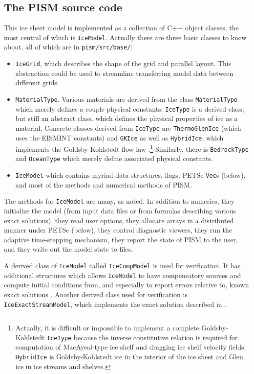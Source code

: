 \documentclass[11pt,final]{amsart}
\renewcommand{\t}[1]{\texttt{#1}}
\begin{document}
\subsection{The PISM source code} This ice sheet model is implemented as a collection of C++ object classes, the most central of which is \t{IceModel}.  Actually there are three basic classes to know about, all of which are in \verb|pism/src/base/|:
\begin{itemize}
\item \t{IceGrid}, which describes the shape of the grid and parallel
layout. This abstraction could be used to streamline transferring model data between
different grids.
\item \t{MaterialType}.  Various materials are derived from the class \t{MaterialType} which merely defines a couple physical constants. \t{IceType} is a derived class, but still an abstract class. which defines the physical properties of ice as a material.  Concrete classes derived from \t{IceType} are \t{ThermoGlenIce} (which uses the
EISMINT constants) and \t{GKIce} as well as \t{HybridIce}, which implements the Goldsby-Kohlstedt flow law \cite{GoldsbyKohlstedt}.\footnote{Actually, it is difficult or impossible to implement a complete Goldsby-Kohlstedt \t{IceType} because the inverse constitutive relation is required for computation of MacAyeal-type ice shelf and dragging ice shelf \cite{MacAyeal} velocity fields. \t{HybridIce} is Goldsby-Kohlstedt ice in the interior of the ice sheet and Glen ice in ice streams and
shelves.}  Similarly, there is \t{BedrockType} and \t{OceanType} which merely define
associated physical constants.
\item \t{IceModel} which contains myriad data structures, flags, PETSc \verb|Vec|s (below), and most of the methods and numerical methods of PISM.\end{itemize}

The methods for \t{IceModel} are many, as noted.  In addition to numerics, they initialize the model (from input data files or from formulas describing various exact solutions), they read user options, they allocate arrays in a distributed manner under PETSc (below), they control diagnostic viewers, they run the adaptive time-stepping mechanism, they report the state of PISM to the user, and they write out the model state to files.

A derived class of \t{IceModel} called \t{IceCompModel} is used for verification.  It has additional structures which allows \t{IceModel} to have compensatory sources and compute initial conditions from, and especially to report errors relative to, known exact solutions \cite{BLKCB,BBL,BB}.  Another derived class used for verification is \t{IceExactStreamModel}, which implements the exact solution described in \cite{SchoofStream}.
\end{document}
